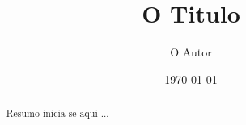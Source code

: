 \documentclass{article}
\title{O Titulo}
\author{O Autor}
\date{\today}
\begin{document}
\maketitle

\begin{abstract}
Resumo inicia-se aqui ...
\end{abstract}
            
\end{document}
